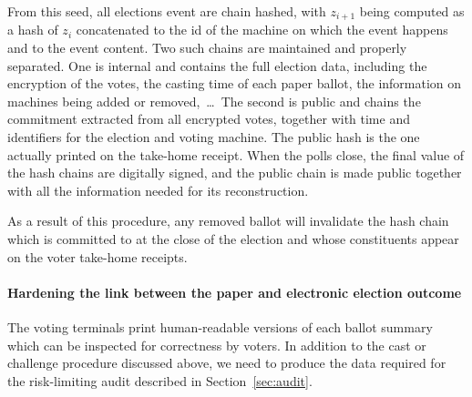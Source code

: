 
From this seed, all elections event are chain hashed, with $z_{i+1}$
being computed as a hash of $z_i$ concatenated to the id of the
machine on which the event happens and to the event content. Two such
chains are maintained and properly separated. One is internal and
contains the full election data, including the encryption of the
votes, the casting time of each paper ballot, the information on
machines being added or removed,~\dots\ The second is public and
chains the commitment extracted from all encrypted votes, together
with time and identifiers for the election and voting machine. The
public hash is the one actually printed on the take-home receipt. When
the polls close, the final value of the hash chains are digitally
signed, and the public chain is made public together with all the
information needed for its reconstruction. 

As a result of this procedure, any removed ballot will
invalidate the hash chain which is committed to at the close of the
election and whose constituents appear on the voter take-home receipts.

\paragraph{Hardening the link between the paper and electronic
  election outcome}
\label{sec:hard-link-betw}

\newcommand{\bid}{\ensuremath{{bid}}\xspace}
\newcommand{\bcid}{\ensuremath{{bcid}}\xspace}

The voting terminals print human-readable versions of each ballot
summary which can be inspected for correctness by voters.  In addition
to the cast or challenge procedure discussed above, we need to produce
the data required for the risk-limiting audit described in
Section~\ref{sec:audit}.

